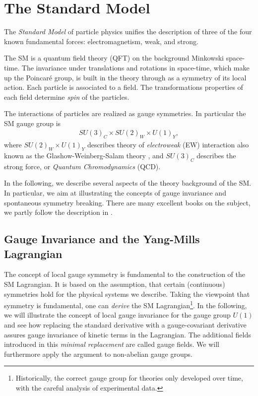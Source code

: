 
\section{The Standard Model}


The \emph{Standard Model} of particle physics unifies the description of three of the
four known fundamental forces: electromagnetism, weak, and strong.

The SM is a quantum field theory (QFT) on the background Minkowski space-time.
The invariance under translations and rotations in space-time, which make up
the Poincaré group, is built in the theory through as a symmetry of its local
action. Each particle is associated to a field. The transformations properties of
each field determine \emph{spin} of the particles.

The interactions of particles are realized as gauge symmetries.
In particular the SM gauge group is
\begin{align}\label{eq:SMgauge}
  SU(3)_C\times SU(2)_W \times U(1)_Y,
\end{align}
where $SU(2)_W \times U(1)_Y$ describes theory of \emph{electroweak} (EW)
interaction also known as the Glashow-Weinberg-Salam theory \cite{Glashow1961a,Weinberg1967a,Salam1968,Glashow1970},
and $SU(3)_C$ describes the strong force, or \emph{Quantum Chromodynamics} (QCD).


In the following, we describe several aspects of the theory background of the
SM. In particular, we aim at illustrating the concepts of gauge
invariance and spontaneous symmetry breaking. There are many
excellent books on the subject, we partly follow the description in \cite{PeskinS,Schwartz:2013pla}.

\subsection{Gauge Invariance and the Yang-Mills Lagrangian}
\label{sec:giym}
The concept of local gauge symmetry is fundamental to the construction
of the SM Lagrangian. It is based on the assumption, that
certain (continuous) symmetries hold for the physical systems we
describe. Taking the viewpoint that symmetry
is fundamental, one can \textit{derive} the SM Lagrangian\footnote{Historically, the correct gauge group for
  theories only developed over time, with the careful analysis of
  experimental data.}. In the following, we will
illustrate the concept of local gauge invariance for the gauge group
$U(1)$ and see how replacing
the standard derivative with a gauge-covariant derivative assures gauge invariance of kinetic terms in
the Lagrangian. The additional fields introduced in this \textit{minimal
  replacement} are called gauge fields. We will furthermore apply the argument to
non-abelian gauge groups.

